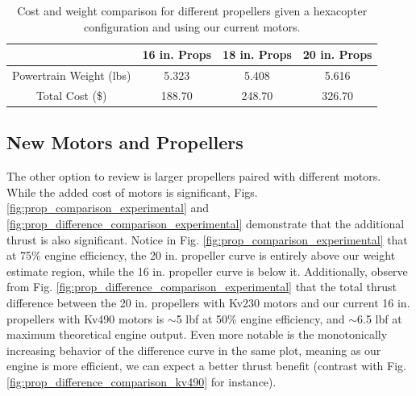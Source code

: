 \documentclass{article}
\begin{document}
\begin{table}[h]
    \centering
    \begin{tabular}{|c|c|c|c|}
        \hline
        \rowcolor{lightgray} %
         & \textbf{16 in. Props} & \textbf{18 in. Props} & \textbf{20 in. Props} \\
        \hline
        Powertrain Weight (lbs) & 5.323 & 5.408 & 5.616 \\
        \hline
        Total Cost (\$) & 188.70 & 248.70 & 326.70 \\
        \hline
    \end{tabular}
    \caption{Cost and weight comparison for different propellers given a hexacopter configuration and using our current motors.}
    \label{tab:prop_comparison}
\end{table}

\subsection{New Motors and Propellers}\label{sec:new-motors-props}
The other option to review is larger propellers paired with different motors. While the added cost of motors is significant, Figs. \ref{fig:prop_comparison_experimental} and \ref{fig:prop_difference_comparison_experimental} demonstrate that the additional thrust is also significant. Notice in Fig. \ref{fig:prop_comparison_experimental} that at 75\% engine efficiency, the 20 in. propeller curve is entirely above our weight estimate region, while the 16 in. propeller curve is below it. Additionally, observe from Fig. \ref{fig:prop_difference_comparison_experimental} that the total thrust difference between the 20 in. propellers with Kv230 motors and our current 16 in. propellers with Kv490 motors is $\sim$5 lbf at 50\% engine efficiency, and $\sim$6.5 lbf at maximum theoretical engine output. Even more notable is the monotonically increasing behavior of the difference curve in the same plot, meaning as our engine is more efficient, we can expect a better thrust benefit (contrast with Fig. \ref{fig:prop_difference_comparison_kv490} for instance).
\end{document}
